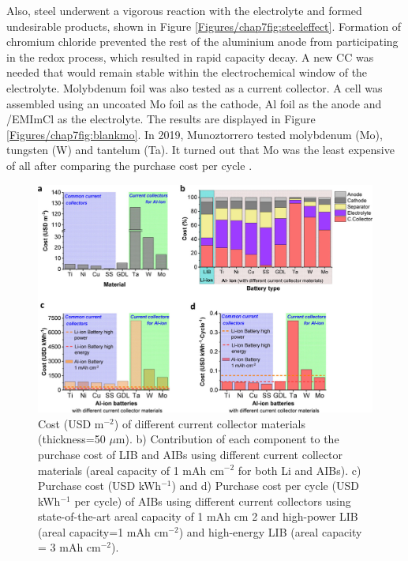 Also, steel underwent a vigorous reaction with the  electrolyte and formed undesirable products, shown in Figure \ref{Figures/chap7fig:steeleffect}. Formation of chromium chloride prevented the rest of the aluminium anode from participating in the redox process, which resulted in rapid capacity decay. A new CC was needed that would remain stable within the electrochemical window of the  electrolyte. Molybdenum foil was also tested as a current collector. A cell was assembled using an uncoated Mo foil as the cathode, Al foil as the anode and /EMImCl as the electrolyte. The results are displayed in Figure \ref{Figures/chap7fig:blankmo}. In 2019, Munoztorrero tested molybdenum (Mo), tungsten (W) and tantelum (Ta). It turned out that Mo was the least expensive of all after comparing the purchase cost per cycle \cite{munoztorrero_unexpected_2019}.  
\begin{figure}[tbh!]
\centering
\includegraphics[width=\textwidth]{Figures/chap7fig/goodmo}
\caption{Cost (USD m$^{-2}$) of different current collector materials (thickness=50 $\mu$m). b) Contribution of each component to the purchase cost of LIB and AIBs using different current collector materials (areal capacity of 1 mAh cm$^{-2}$ for both Li and AIBs). c) Purchase cost (USD kWh$^{-1}$) and d) Purchase cost per cycle (USD kWh$^{-1}$ per cycle) of AIBs using different current collectors using state-of-the-art areal capacity of 1 mAh cm 2 and high-power LIB (areal capacity=1 mAh cm$^{-2}$) and high-energy LIB (areal capacity = 3 mAh cm$^{-2}$).}
\label{Figures/chap7fig:goodmo}
\end{figure}

